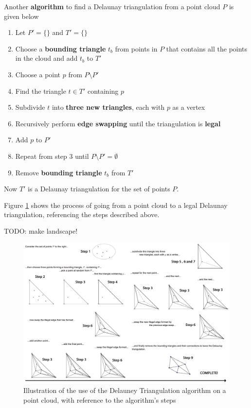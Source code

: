 \documentclass{article}
\begin{document}
Another \textbf{algorithm} to find a Delaunay triangulation from a point cloud $P$ is given below
\begin{enumerate}
	\item Let $P' = \lbrace \rbrace$ and $T' = \lbrace \rbrace$
	\item Choose a \textbf{bounding triangle} $t_b$ from points in $P$ that contains all the points in the cloud and add $t_b$ to $T'$
	\item Choose a point $p$ from $P \setminus P'$
	\item Find the triangle $t \in T'$ containing $p$
	\item Subdivide $t$ into \textbf{three new triangles}, each with $p$ as a vertex
	\item Recursively perform \textbf{edge swapping} until the triangulation is \textbf{legal}
	\item Add $p$ to $P'$
	\item Repeat from step 3 until $P \setminus P' = \emptyset$
	\item Remove \textbf{bounding triangle} $t_b$ from $T'$
\end{enumerate}
Now $T'$ is a Delaunay triangulation for the set of points $P$.

Figure \ref{fig:delaunay-triangulation-example} shows the process of going from a point cloud to a legal Delaunay triangulation, referencing the steps described above.

TODO: make landscape!
\begin{figure}[H]
	\centering
	\includegraphics[scale=0.35]{figures/delaunay-triangulation-example.png}
	\caption{Illustration of the use of the Delauney Triangulation algorithm on a point cloud, with reference to the algorithm's steps}
	\label{fig:delaunay-triangulation-example}
\end{figure}
\end{document}
